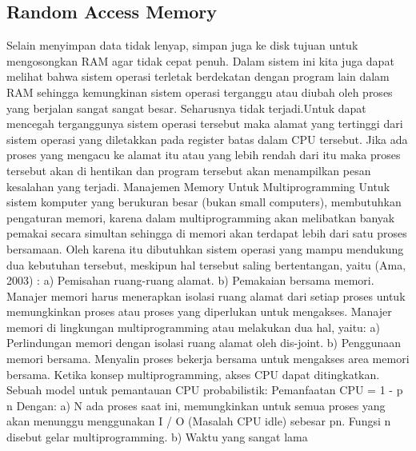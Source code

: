 \subsection {Random Access Memory}
Selain menyimpan data tidak lenyap, simpan juga ke disk tujuan untuk mengosongkan RAM agar tidak cepat penuh.
Dalam sistem ini kita juga dapat melihat bahwa sistem operasi terletak berdekatan dengan program lain dalam RAM sehingga kemungkinan sistem operasi terganggu atau diubah oleh proses yang berjalan sangat sangat besar. Seharusnya tidak terjadi.Untuk dapat  mencegah terganggunya sistem operasi tersebut maka alamat yang tertinggi dari sistem operasi yang diletakkan pada register batas dalam CPU tersebut. Jika ada proses yang mengacu ke alamat itu atau yang lebih rendah dari itu maka proses tersebut akan di hentikan dan program tersebut akan menampilkan pesan kesalahan yang terjadi. Manajemen Memory  Untuk Multiprogramming
Untuk sistem komputer yang berukuran besar (bukan small computers), membutuhkan pengaturan memori, karena dalam multiprogramming akan melibatkan banyak pemakai secara simultan sehingga di memori akan terdapat lebih dari satu proses bersamaan.  Oleh karena itu dibutuhkan sistem operasi yang mampu mendukung dua kebutuhan tersebut, meskipun hal tersebut saling bertentangan, yaitu (Ama, 2003) :
a)      Pemisahan ruang-ruang alamat.
b)      Pemakaian bersama memori.
Manajer memori harus menerapkan isolasi ruang alamat dari setiap proses untuk memungkinkan proses atau proses yang diperlukan untuk mengakses. Manajer memori di lingkungan multiprogramming atau melakukan dua hal, yaitu:
a) Perlindungan memori dengan isolasi ruang alamat oleh dis-joint.
b) Penggunaan memori bersama.
Menyalin proses bekerja bersama untuk mengakses area memori bersama. Ketika konsep multiprogramming, akses CPU dapat ditingkatkan. Sebuah model untuk pemantauan CPU probabilistik:
Pemanfaatan CPU = 1 - p n
Dengan:
a) N ada proses saat ini, memungkinkan untuk semua proses yang akan menunggu menggunakan I / O (Masalah CPU idle) sebesar pn. Fungsi n disebut gelar multiprogramming.
b) Waktu yang sangat lama

